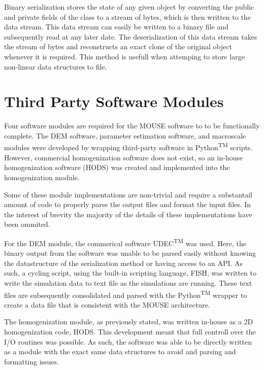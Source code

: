 Binary serialization stores the state of any given object by converting the public and private fields of the class to a stream of bytes, which is then written to the data stream. This data stream can easily be written to a binary file and subsequently read at any later date. The deserialization of this data stream takes the stream of bytes and reconstructs an exact clone of the original object whenever it is required. This method is usefull when attemping to store large non-linear data structures to file.


\section{Third Party Software Modules}

Four software modules are required for the MOUSE software to to be functionally complete. The DEM software, parameter estimation software, and macroscale modules were developed by wrapping third-party software in Python\textsuperscript{TM} scripts. However, commercial homogenization software does not exist, so an in-house homogenization software (HODS) was created and implemented into the homogenization module.

Some of these module implementations are non-trivial and require a substantail amount of code to properly parse the output files and format the input files. In the interest of brevity the majority of the details of these implementations have been ommited. 

For the DEM module, the commerical software UDEC\textsuperscript{TM} was used. Here, the binary output from the software was unable to be parsed easily without knowing the datastructure of the serialization method or having access to an API. As such, a cycling script, using the built-in scripting language, FISH, was written to write the simulation data to text file as the simulations are running. These text files are subsequently consolidated and parsed with the Python\textsuperscript{TM} wrapper to create a data file that is consistent with the MOUSE architecture. 

The homogenization module, as previously stated, was written in-house as a 2D homogenization code, HODS. This development meant that full controll over the I/O routines was possible. As such, the software was able to be directly written as a module with the exact same data structures to avoid and parsing and formatting issues.

